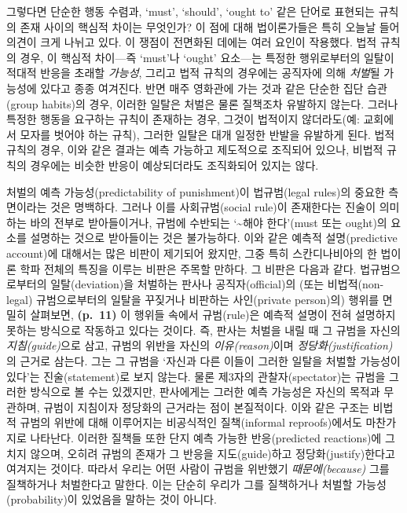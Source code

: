 \documentclass[12pt, oneside]{book}  %
\begin{document}
그렇다면 단순한 행동 수렴과, `must', `should', `ought to' 같은 단어로
표현되는 규칙의 존재 사이의 핵심적 차이는 무엇인가? 이 점에 대해
법이론가들은 특히 오늘날 들어 의견이 크게 나뉘고 있다. 이 쟁점이
전면화된 데에는 여러 요인이 작용했다. 법적 규칙의 경우, 이 핵심적
차이---즉 `must'나 `ought' 요소---는 특정한 행위로부터의 일탈이 적대적
반응을 초래할 \emph{가능성}, 그리고 법적 규칙의 경우에는 공직자에 의해
\emph{처벌}될 가능성에 있다고 종종 여겨진다. 반면 매주 영화관에 가는
것과 같은 단순한 집단 습관(group habits)의 경우, 이러한 일탈은 처벌은
물론 질책조차 유발하지 않는다. 그러나 특정한 행동을 요구하는 규칙이
존재하는 경우, 그것이 법적이지 않더라도(예: 교회에서 모자를 벗어야 하는
규칙), 그러한 일탈은 대개 일정한 반발을 유발하게 된다. 법적 규칙의 경우,
이와 같은 결과는 예측 가능하고 제도적으로 조직되어 있으나, 비법적 규칙의
경우에는 비슷한 반응이 예상되더라도 조직화되어 있지는 않다.

처벌의 예측 가능성(predictability of punishment)이 법규범(legal rules)의
중요한 측면이라는 것은 명백하다. 그러나 이를 사회규범(social rule)이
존재한다는 진술이 의미하는 바의 전부로 받아들이거나, 규범에 수반되는
`\textasciitilde 해야 한다'(must 또는 ought)의 요소를 설명하는 것으로
받아들이는 것은 불가능하다. 이와 같은 예측적 설명(predictive account)에
대해서는 많은 비판이 제기되어 왔지만, 그중 특히 스칸디나비아의 한 법이론
학파 전체의 특징을 이루는 비판은 주목할 만하다. 그 비판은 다음과 같다.
법규범으로부터의 일탈(deviation)을 처벌하는 판사나 공직자(official)의
(또는 비법적(non-legal) 규범으로부터의 일탈을 꾸짖거나 비판하는
사인(private person)의) 행위를 면밀히 살펴보면, \textbf{(p.~11)} 이
행위들 속에서 규범(rule)은 예측적 설명이 전혀 설명하지 못하는 방식으로
작동하고 있다는 것이다. 즉, 판사는 처벌을 내릴 때 그 규범을 자신의
\emph{지침(guide)}으로 삼고, 규범의 위반을 자신의
\emph{이유(reason)}이며 \emph{정당화(justification)}의 근거로 삼는다.
그는 그 규범을 `자신과 다른 이들이 그러한 일탈을 처벌할 가능성이 있다'는
진술(statement)로 보지 않는다. 물론 제3자의 관찰자(spectator)는 규범을
그러한 방식으로 볼 수는 있겠지만, 판사에게는 그러한 예측 가능성은 자신의
목적과 무관하며, 규범이 지침이자 정당화의 근거라는 점이 본질적이다. 이와
같은 구조는 비법적 규범의 위반에 대해 이루어지는 비공식적인
질책(informal reproofs)에서도 마찬가지로 나타난다. 이러한 질책들 또한
단지 예측 가능한 반응(predicted reactions)에 그치지 않으며, 오히려
규범의 존재가 그 반응을 지도(guide)하고 정당화(justify)한다고 여겨지는
것이다. 따라서 우리는 어떤 사람이 규범을 위반했기 \emph{때문에(because)}
그를 질책하거나 처벌한다고 말한다. 이는 단순히 우리가 그를 질책하거나
처벌할 가능성(probability)이 있었음을 말하는 것이 아니다.
\end{document}

